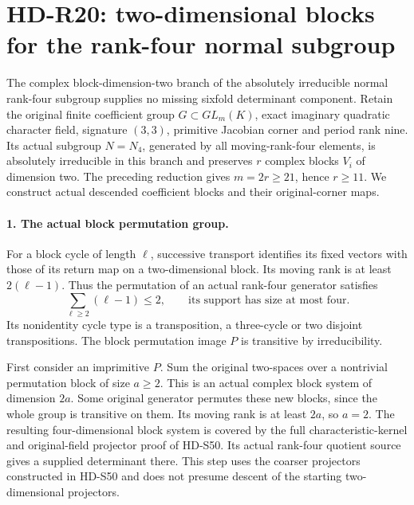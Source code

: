 \section{HD-R20: two-dimensional blocks for the rank-four normal subgroup}
\label{sec:two-block-rank-four}

The complex block-dimension-two branch of the absolutely
irreducible normal rank-four subgroup supplies no missing
sixfold determinant component. Retain the original finite
coefficient group \(G\subset GL_m(K)\), exact imaginary
quadratic character field, signature \((3,3)\), primitive
Jacobian corner and period rank nine. Its actual subgroup
\(N=N_4\), generated by all moving-rank-four elements,
is absolutely irreducible in this branch and preserves
\(r\) complex blocks \(V_i\) of dimension two.
The preceding reduction gives \(m=2r\ge21\), hence
\(r\ge11\). We construct actual descended coefficient
blocks and their original-corner maps.

\paragraph{1. The actual block permutation group.}
For a block cycle of length \(\ell\), successive
transport identifies its fixed vectors with those of its
return map on a two-dimensional block. Its moving rank
is at least \(2(\ell-1)\). Thus the permutation of
an actual rank-four generator satisfies
\[
 \sum_{\ell\ge2}(\ell-1)\le2,
 \qquad\text{its support has size at most four}.          \tag{R20.1}
\]
Its nonidentity cycle type is a transposition, a
three-cycle or two disjoint transpositions. The block
permutation image \(P\) is transitive by irreducibility.

First consider an imprimitive \(P\). Sum the original
two-spaces over a nontrivial permutation block of size
\(a\ge2\). This is an actual complex block system
of dimension \(2a\). Some original generator permutes
these new blocks, since the whole group is transitive
on them. Its moving rank is at least \(2a\), so
\(a=2\). The resulting four-dimensional block system
is covered by the full characteristic-kernel and
original-field projector proof of HD-S50. Its actual
rank-four quotient source gives a supplied determinant
there. This step uses the coarser projectors constructed
in HD-S50 and does not presume descent of the starting
two-dimensional projectors.

